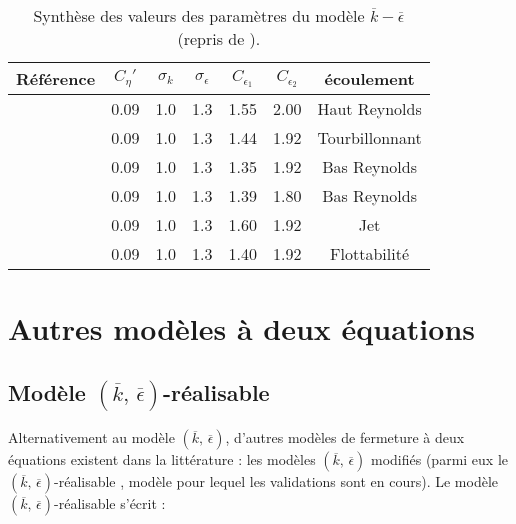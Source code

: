 \begin{table}
\begin{centering}
\begin{tabular}{ccccccc}
\hline 
R\'ef\'erence & $C_{\eta}'$ & $\sigma_{k}$ & $\sigma_{\epsilon}$ & $C_{\epsilon_{1}}$ & $C_{\epsilon_{2}}$ & \'ecoulement\tabularnewline
\hline 
\cite{Jones-Launder_IJHMT1972} & 0.09 & 1.0 & 1.3 & 1.55 & 2.00 & Haut Reynolds\tabularnewline
\cite{Launder-Sharma_LettHMT1974} & 0.09 & 1.0 & 1.3 & 1.44 & 1.92 & Tourbillonnant\tabularnewline
\cite{Chien_AIAA1982} & 0.09 & 1.0 & 1.3 & 1.35 & 1.92 & Bas Reynolds\tabularnewline
\cite{Fan_etal_AIAA1993} & 0.09 & 1.0 & 1.3 & 1.39 & 1.80 & Bas Reynolds\tabularnewline
\cite{Morgans-etal_Conf1999} & 0.09 & 1.0 & 1.3 & 1.60 & 1.92 & Jet\tabularnewline
\cite{Bahari-Hejazi_IJPMS2009} & 0.09 & 1.0 & 1.3 & 1.40 & 1.92 & Flottabilit\'e\tabularnewline
\hline 
\end{tabular}
\par\end{centering}

\protect\caption{\label{tab:Synthese-valeurs_Coeffkeps}Synth\`ese des valeurs des param\`etres
du mod\`ele $\overline{k}-\overline{\epsilon}$ (repris de \cite{Genty_RapportCEA_2019}).}
\end{table}



\section{Autres mod\`eles \`a deux \'equations}


\subsection*{Mod\`ele $(\overline{k},\,\overline{\epsilon})$-\og r\'ealisable \fg{}}

Alternativement au mod\`ele $(\overline{k},\,\overline{\epsilon})$,
d'autres mod\`eles de fermeture \`a deux \'equations existent dans la litt\'erature
: les mod\`eles $(\overline{k},\,\overline{\epsilon})$ modifi\'es (parmi
eux le $(\overline{k},\,\overline{\epsilon})$-\og r\'ealisable \fg{}
, mod\`ele pour lequel les validations sont en cours). Le mod\`ele $(\overline{k},\,\overline{\epsilon})$-\og r\'ealisable \fg{}
s'\'ecrit \cite[Eq. (22) et (23) p. 233]{Shi_etal_keps-realisable_CF1995}
:

